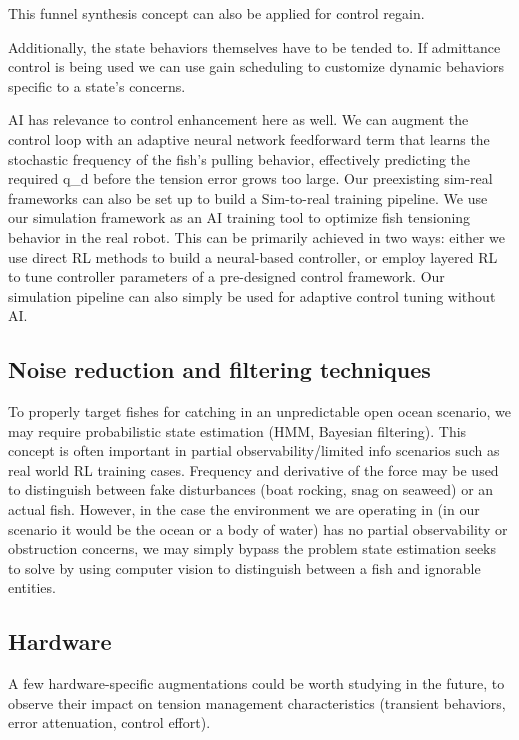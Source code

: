 \documentclass[conference]{IEEEtran}
\begin{document}
This funnel synthesis concept can also be applied for control regain.

Additionally, the state behaviors themselves have to be tended to. If admittance control is being used we can use gain scheduling to customize dynamic behaviors specific to a state's concerns.

AI has relevance to control enhancement here as well. We can augment the control loop with an adaptive neural network feedforward term that learns the stochastic frequency of the fish's pulling behavior, effectively predicting the required q\_d before the tension error grows too large. Our preexisting sim-real frameworks can also be set up to build a Sim-to-real training pipeline. We use our simulation framework as an AI training tool to optimize fish tensioning behavior in the real robot. This can be primarily achieved in two ways: either we use direct RL methods to build a neural-based controller, or employ layered RL to tune controller parameters of a pre-designed control framework. Our simulation pipeline can also simply be used for adaptive control tuning without AI.

\subsection{Noise reduction and filtering techniques}
To properly target fishes for catching in an unpredictable open ocean scenario, we may require probabilistic state estimation (HMM, Bayesian filtering). This concept is often important in partial observability/limited info scenarios such as real world RL training cases. Frequency and derivative of the force may be used to distinguish between fake disturbances (boat rocking, snag on seaweed) or an actual fish. However, in the case the environment we are operating in (in our scenario it would be the ocean or a body of water) has no partial observability or obstruction concerns, we may simply bypass the problem state estimation seeks to solve by using computer vision to distinguish between a fish and ignorable entities.

\subsection{Hardware}
A few hardware-specific augmentations could be worth studying in the future, to observe their impact on tension management characteristics (transient behaviors, error attenuation, control effort).
\end{document}
